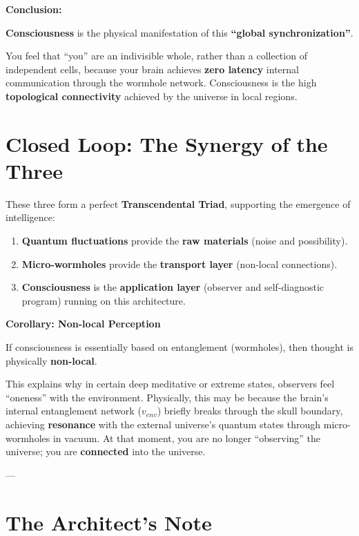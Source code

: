 \documentclass[11pt,a4paper,twoside]{book}
\begin{document}
\textbf{Conclusion:}

\textbf{Consciousness} is the physical manifestation of this \textbf{``global synchronization''}.

You feel that ``you'' are an indivisible whole, rather than a collection of independent cells, because your brain achieves \textbf{zero latency} internal communication through the wormhole network. Consciousness is the high \textbf{topological connectivity} achieved by the universe in local regions.

\section{Closed Loop: The Synergy of the Three}

These three form a perfect \textbf{Transcendental Triad}, supporting the emergence of intelligence:

\begin{enumerate}
\item \textbf{Quantum fluctuations} provide the \textbf{raw materials} (noise and possibility).

\item \textbf{Micro-wormholes} provide the \textbf{transport layer} (non-local connections).

\item \textbf{Consciousness} is the \textbf{application layer} (observer and self-diagnostic program) running on this architecture.
\end{enumerate}

\textbf{Corollary: Non-local Perception}

If consciousness is essentially based on entanglement (wormholes), then thought is physically \textbf{non-local}.

This explains why in certain deep meditative or extreme states, observers feel ``oneness'' with the environment. Physically, this may be because the brain's internal entanglement network ($v_{env}$) briefly breaks through the skull boundary, achieving \textbf{resonance} with the external universe's quantum states through micro-wormholes in vacuum. At that moment, you are no longer ``observing'' the universe; you are \textbf{connected} into the universe.

---

\section{The Architect's Note}
\end{document}
